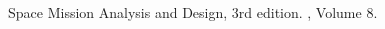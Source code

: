 \documentclass[twoside]{article}
\begin{document}
\begin{multicols}{2}
         \begin{thebibliography}{99} %

               \newblock Space Mission Analysis and Design, 3rd edition.
               , Volume 8.


         \end{thebibliography}


      \end{multicols}

      
\end{document}
